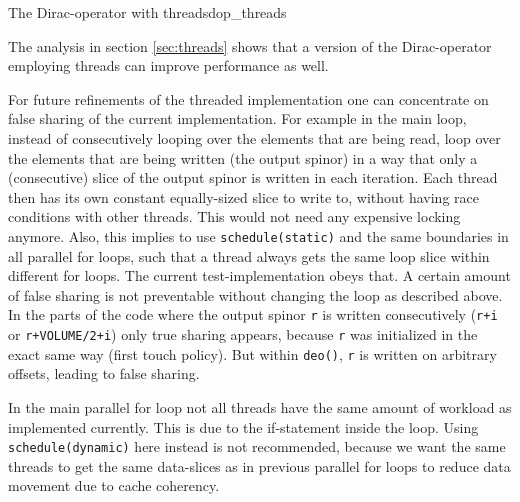 \documentclass{article}
\theoremstyle{plain} %
\theoremstyle{convention} %
\theoremstyle{remark} %
\def\code#1{\texttt{#1}}
\numberwithin{equation}{section}
\begin{document}
\begin{proposal}{The Dirac-operator with threads}{dop_threads}

The analysis in section \ref{sec:threads} shows that a version of the Dirac-operator employing threads can improve performance as well.

For future refinements of the threaded implementation one can concentrate on false sharing of the current implementation. For example in the main loop, instead of consecutively looping over the elements that are being read, loop over the elements that are being written (the output spinor) in a way that only a (consecutive) slice of the output spinor is written in each iteration. Each thread then has its own constant equally-sized slice to write to, without having race conditions with other threads. This would not need any expensive locking anymore. Also, this implies to use \code{schedule(static)} and the same boundaries in all parallel for loops, such that a thread always gets the same loop slice within different for loops. The current test-implementation obeys that. A certain amount of false sharing is not preventable without changing the loop as described above. In the parts of the code where the output spinor \code{r} is written consecutively (\code{r+i} or \code{r+VOLUME/2+i}) only true sharing appears, because \code{r} was initialized in the exact same way (first touch policy). But within \code{deo()}, \code{r} is written on arbitrary offsets, leading to false sharing.

In the main parallel for loop not all threads have the same amount of workload as implemented currently. This is due to the if-statement inside the loop. Using \code{schedule(dynamic)} here instead is not recommended, because we want the same threads to get the same data-slices as in previous parallel for loops to reduce data movement due to cache coherency.

\end{proposal}
\end{document}
